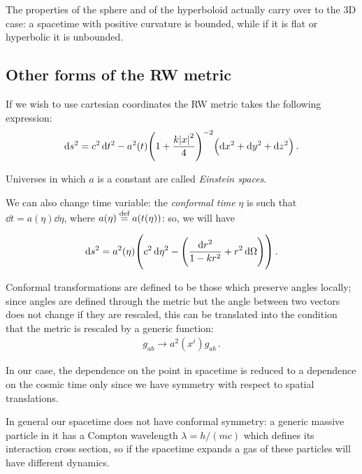 \documentclass[main.tex]{subfiles}
\begin{document}
The properties of the sphere and of the hyperboloid actually carry over to the 3D case: a spacetime with positive curvature is bounded, while if it is flat or hyperbolic it is unbounded.

\subsection{Other forms of the RW metric}

If we wish to use cartesian coordinates the RW metric takes the following expression:
%
\begin{equation}
  \dd{s^2} = c^2 \dd{t^2} - a^2 (t) \qty(1 + \frac{k \abs{x}^2}{4} )^{-2} \qty(\dd{x^2} + \dd{y^2} + \dd{z^2}) \,.
\end{equation}

Universes in which \(a\) is a constant are called \emph{Einstein spaces}.

We can also change time variable: the \emph{conformal time} \(\eta \) is such that \(\dd{t} = a(\eta) \dd{\eta} \), where \(a(\eta) \stackrel{\text{def}}{=} a(t(\eta))\): so, we will have

\begin{equation}
  \dd{s^2} = a^2 (\eta) \qty(c^2 \dd{\eta^2} - \qty(\frac{\dd{r^2}}{1 - kr^2} + r^2 \dd{\Omega})) \,.
\end{equation}

\begin{bluebox}
Conformal transformations are defined to be those which preserve angles locally; since angles are defined through the metric but the angle between two vectors does not change if they are rescaled, this can be translated into the condition that the metric is rescaled by a generic function:
%
\begin{align}
g_{ab} \rightarrow a^2(x^{i}) g_{ab}
\,.
\end{align}

In our case, the dependence on the point in spacetime is reduced to a dependence on the cosmic time only since we have symmetry with respect to spatial translations.
\end{bluebox}

In general our spacetime does not have conformal symmetry: a generic massive particle in it has a Compton wavelength \(\lambda = h / (mc)\) which defines its interaction cross section, so if the spacetime expands a gas of these particles will have different dynamics.
\end{document}

